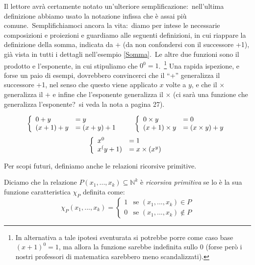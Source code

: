 \noindent Il lettore avrà certamente notato un'ulteriore semplificazione:\ nell'ultima definizione abbiamo usato la notazione infissa che è assai più comune.\
Semplifichiamoci ancora la vita:\ diamo per intese le necessarie composizioni e proiezioni e guardiamo alle seguenti definizioni, in cui riappare la definizione della somma, indicata da $+$ (da non confondersi con il successore +1), già vista in tutti i dettagli nell'esempio \ref{Somma}.\
Le altre due funzioni sono il prodotto e l'esponente, in cui stipuliamo che $0^0 = 1$.\ \footnote{In alternativa a tale ipotesi sventurata si potrebbe porre come caso base $(x + 1)^0 = 1$, ma allora la funzione sarebbe indefinita sullo 0 (forse però i nostri professori di matematica sarebbero meno scandalizzati).}
Una rapida ispezione, e forse un paio di esempi, dovrebbero convincerci che il ``+'' generalizza il successore +1, nel senso che questo viene applicato $x$ volte a $y$, e che il $\times$ generalizza il $+$ e infine che l'esponente generalizza il $\times$ (ci sarà una funzione che generalizza l'esponente?\ si veda la nota a pagina 27).

\[
    \left\{\begin{array}{l l}
        0+y      & = y           \\
        (x+1) +y & = (x + y) + 1 \\
    \end{array}\right.\qquad
    \left\{\begin{array}{l l}
        0 \times y     & = 0                \\
        (x+1) \times y & = (x \times y) + y \\
    \end{array}\right.
\]
\[
    \left\{\begin{array}{l l}
        x^0       & = 1              \\
        x^(y + 1) & = x \times (x^y) \\
    \end{array}\right.
\]

\vspace{12pt}

\noindent Per scopi futuri, definiamo anche le relazioni ricorsive primitive.

\begin{definition}
    Diciamo che la relazione $P(x_1,...,x_k) \subseteq \mathbb{N}^k$ è \textit{ricorsiva primitiva} se lo è la sua funzione caratteristica $\chi_P$ definita come:
    \[
        \chi_P(x_1,...,x_k) =
        \begin{cases}
            1 & \text{se } (x_1,...,x_k)\in P      \\
            0 & \text{se } (x_1,...,x_k)\not \in P
        \end{cases}
    \]
\end{definition}

